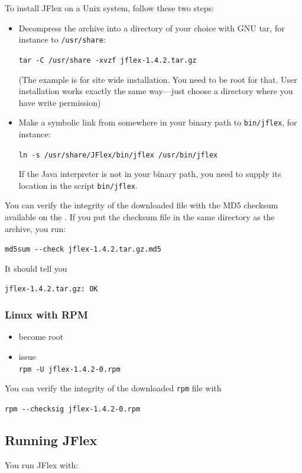\documentclass[11pt]{scrartcl}
\newcommand{\ver}{1.4.2}
\begin{document}
To install JFlex on a Unix system, follow these two steps:
\begin{itemize}
\item
  Decompress the archive into a directory of your choice
  with GNU tar, for instance to \texttt{/usr/share}:

  \texttt{tar -C /usr/share -xvzf jflex-\ver.tar.gz}
  
  (The example is for site wide installation. You need to
  be root for that. User installation works exactly the
  same way---just choose a directory where you have write
  permission)

\item
  Make a symbolic link from somewhere in your binary 
  path to \texttt{bin/jflex}, for instance:

  \texttt{ln -s /usr/share/JFlex/bin/jflex /usr/bin/jflex}

  If the Java interpreter is not in your binary path, you
  need to supply its location in the script \texttt{bin/jflex}.
\end{itemize}

You can verify the integrity of the downloaded file with
the MD5 checksum available on the . 
If you put the checksum file in the same directory
as the archive, you run:

\verb+md5sum --check +\texttt{jflex-\ver.tar.gz.md5}

It should tell you

\texttt{jflex-\ver.tar.gz: OK}

\subsubsection{Linux with RPM}

\begin{itemize}
\item
  become root
\item issue\\
  \texttt{rpm -U jflex-\ver-0.rpm}
\end{itemize}

You can verify the integrity of the downloaded \texttt{rpm} file with

\verb+rpm --checksig +\texttt{jflex-\ver-0.rpm}


\subsection{Running JFlex}
You run JFlex with:
\end{document}
